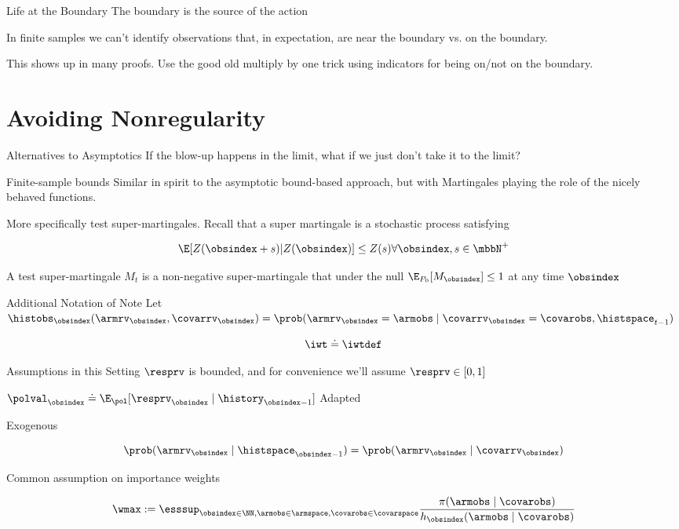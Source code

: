 \documentclass[aspectratio=169, professionalfonts]{beamer}
\begin{document}
\begin{frame}{Life at the Boundary}
	The boundary is the source of the action

	In finite samples we can't identify observations that, in expectation, are
	near the boundary vs. on the boundary.

	This shows up in many proofs. Use the good old multiply by one trick using
    indicators for being on/not on the boundary.

  \end{frame}

\section{Avoiding Nonregularity}
\begin{frame}{Alternatives to Asymptotics}
	If the blow-up happens in the limit, what if we just don't take it to the limit?
\end{frame}

\begin{frame}{Finite-sample bounds}
	Similar in spirit to the asymptotic bound-based approach, but with Martingales
	playing the role of the nicely behaved functions.

	More specifically test super-martingales. Recall that a super martingale is
	a stochastic process satisfying

	$$\E[Z(\obsindex + s) | Z(\obsindex)] \leq Z(s) \forall \obsindex, s \in \mbbN^+$$

	A test super-martingale $M_t$ is a non-negative super-martingale that under
	the null $\E_{P_0}[M_\obsindex] \leq 1$ at any time $\obsindex$
\end{frame}

\begin{frame}{Additional Notation of Note}
	Let $\histobs_{\obsindex}(\armrv_{\obsindex}, \covarrv_{\obsindex}) =
		\prob(\armrv_{\obsindex} = \armobs \mid \covarrv_{\obsindex} = \covarobs, \histspace_{t-1})$

	\[\iwt \doteq \iwtdef \]
\end{frame}

\begin{frame}{Assumptions in this Setting}
	$\resprv$ is bounded, and for convenience we'll assume $\resprv \in [0,1]$

	$\polval_{\obsindex} \doteq \E_{\pol} [\resprv_{\obsindex} \mid \history_{\obsindex-1}]$
	Adapted

	Exogenous

	$$\prob(\armrv_{\obsindex} \mid \histspace_{\obsindex - 1}) =
		\prob(\armrv_{\obsindex} \mid \covarrv_{\obsindex})$$

	Common assumption on importance weights

	\[\wmax := \esssup_{\obsindex \in \NN, \armobs \in \armspace, \covarobs \in \covarspace} \frac{\pi(\armobs \mid \covarobs)}{h_{\obsindex}(\armobs \mid \covarobs)} \]
\end{frame}
\end{document}
